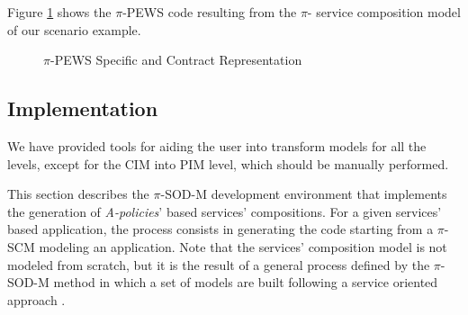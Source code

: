 Figure \ref{fig:Specific-Contract-Representation} shows the $\pi$-PEWS code resulting from the $\pi$- service composition model  of our scenario example.

\begin{figure}
\caption{$\pi$-PEWS Specific and Contract Representation}
\label{fig:Specific-Contract-Representation}
\end{figure}

\subsection{Implementation}
We have provided tools for aiding the user into transform models for all the levels, except for the CIM into PIM level, which should be manually performed.




This section  describes the $\pi$-SOD-M development environment that implements the generation of {\em A-policies}' based services' compositions. For a given services' based application, the process  consists in generating the  code starting from a $\pi$-SCM modeling an application. Note that the services' composition model is not modeled from scratch, but it is the result of a general process defined by the $\pi$-SOD-M method in which a set of models are built following a service oriented approach \cite{decastro1}.


